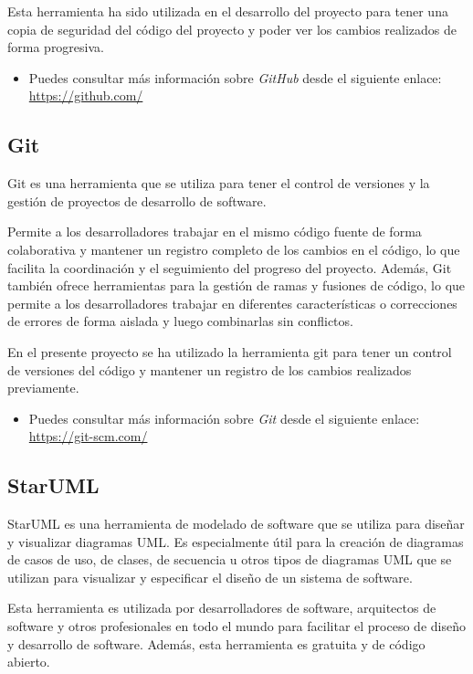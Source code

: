 Esta herramienta ha sido utilizada en el desarrollo del proyecto para tener una copia de seguridad del código del proyecto y poder ver los cambios realizados de forma progresiva.

\begin{itemize}
    \item Puedes consultar más información sobre  \textit{GitHub}  desde el siguiente enlace: \url{https://github.com/}
\end{itemize}

\subsection{Git} \label{GIT}
Git es una herramienta que se utiliza para tener el control de versiones y la gestión de proyectos de desarrollo de software.

Permite a los desarrolladores trabajar en el mismo código fuente de forma colaborativa y mantener un registro completo de los cambios en el código, lo que facilita la coordinación y el seguimiento del progreso del proyecto. Además, Git también ofrece herramientas para la gestión de ramas y fusiones de código, lo que permite a los desarrolladores trabajar en diferentes características o correcciones de errores de forma aislada y luego combinarlas sin conflictos. 

En el presente proyecto se ha utilizado la herramienta git para tener un control de versiones del código y mantener un registro de los cambios realizados previamente. 

\begin{itemize}
    \item Puedes consultar más información sobre  \textit{Git}  desde el siguiente enlace: \url{https://git-scm.com/}
\end{itemize}

\subsection{StarUML} \label{STARUML}

StarUML es una herramienta de modelado de software que se utiliza para diseñar y visualizar diagramas UML. Es especialmente útil para la creación de diagramas de casos de uso, de clases, de secuencia u otros tipos de diagramas UML que se utilizan para visualizar y especificar el diseño de un sistema de software. 

Esta herramienta es utilizada por desarrolladores de software, arquitectos de software y otros profesionales en todo el mundo para facilitar el proceso de diseño y desarrollo de software. Además, esta herramienta es gratuita y de código abierto.


